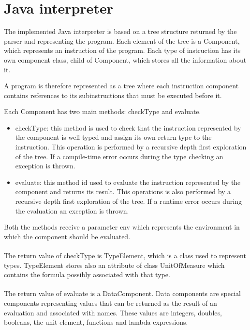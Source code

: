 \documentclass[]{article}
\begin{document}
	\section{Java interpreter}
	\label{sec:javaInterpreter}
		The implemented Java interpreter is based on a tree structure returned by the parser and representing the program. Each element of the tree is a Component, which represents an instruction of the program. Each type of instruction has its own component class, child of Component, which stores all the information about it. 
		
		A program is therefore represented as a tree where each instruction component contains references to its subinstructions that must be executed before it. 
		
		Each Component has two main methods: checkType and evaluate.
		\begin{itemize}
			\item checkType: this method is used to check that the instruction represented by the component is well typed and assign its own return type to the instruction. This operation is performed by a recursive depth first exploration of the tree. If a compile-time error occurs during the type checking an exception is thrown.
			\item evaluate: this method id used to evaluate the instruction represented by the component and returns its result. This operations is also performed by a recursive depth first exploration of the tree. If a runtime error occurs during the evaluation an exception is thrown.
		\end{itemize}
	
		Both the methods receive a parameter env which represents the environment in which the component should be evaluated.\\\\
		The return value of checkType is TypeElement, which is a class used to represent types. TypeElement stores also an attribute of class UnitOfMeasure which contains the formula possibly associated with that type.\\\\
		The return value of evaluate is a DataComponent. Data components are special components representing values that can be returned as the result of an evaluation and associated with names. These values are integers, doubles, booleans, the unit element, functions and lambda expressions.
	
\end{document}
